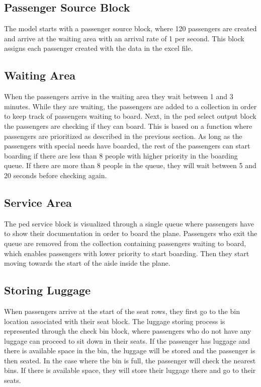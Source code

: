 \subsection{Passenger Source Block}
The model starts with a passenger source block, where 120 passengers are created and arrive at the waiting area with an arrival rate of 1 per second. This block assigns each passenger created with the data in the excel file. 

\subsection{Waiting Area}
When the passengers arrive in the waiting area they wait between 1 and 3 minutes. While they are waiting, the passengers are added to a collection in order to keep track of passengers waiting to board. Next, in the ped select output block the passengers are checking if they can board. This is based on a function where passengers are prioritized as described in the previous section. As long as the passengers with special needs have boarded, the rest of the passengers can start boarding if there are less than 8 people with higher priority in the boarding queue. If there are more than 8 people in the queue, they will wait between 5 and 20 seconds before checking again.   

\subsection{Service Area}
The ped service block is visualized through a single queue where passengers have to show their documentation in order to board the plane. Passengers who exit the queue are removed from the collection containing passengers waiting to board, which enables passengers with lower priority to start boarding. Then they start moving towards the start of the aisle inside the plane.

\subsection{Storing Luggage}
When passengers arrive at the start of the seat rows, they first go to the bin location associated with their seat block. The luggage storing process is represented through the check bin block, where passengers who do not have any luggage can proceed to sit down in their seats. If the passenger has luggage and there is available space in the bin, the luggage will be stored and the passenger is then seated. In the case where the bin is full, the passenger will check the nearest bins. If there is available space, they will store their luggage there and go to their seats. 

